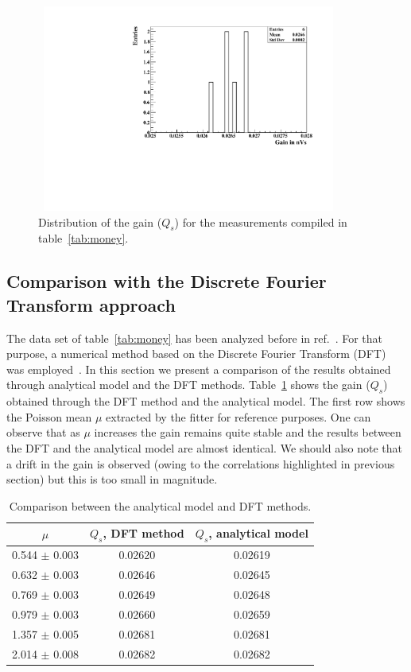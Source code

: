 \documentclass[preprint,12pt]{elsarticle}
\begin{document}
\begin{figure}[!t]
\centering
\includegraphics[width=10.0cm, height=6.8cm]{figures/Qs.pdf} 
\caption{Distribution of the gain ($Q_s$) for the measurements compiled in table~\ref{tab:money}. }
\label{fig:g}
\end{figure}

\subsection{Comparison with the Discrete Fourier Transform approach}

The data set of table~\ref{tab:money} has been analyzed before in ref.~\cite{me2}. 
For that purpose, a numerical method based on the Discrete Fourier Transform (DFT) was employed~\cite{me}. 
In this section we present a comparison of the results obtained through analytical model and the DFT methods. 
 Table~\ref{tab:comp} shows the gain ($Q_s$) obtained through the DFT method and the analytical model. 
The first row shows the Poisson mean $\mu$ extracted by the fitter for reference purposes. 
One can observe that as $\mu$ increases the gain remains quite stable and the results between the DFT and the analytical model are almost identical. 
We should also note that a drift in the gain is observed (owing to the correlations highlighted in previous section) but this is too small in magnitude.   

\begin{table}[t!]
\centering
\begin{tabular}{| c  || c | c |}
\hline
$\mu$                      & $Q_s$, DFT method  	       & $Q_s$, analytical model           \\[0.6ex] \hline\hline
0.544 $\pm$ 0.003  & 0.02620					       & 0.02619 						     				\\
0.632 $\pm$ 0.003  & 0.02646					       & 0.02645					  	    				\\
0.769 $\pm$ 0.003  & 0.02649					       & 0.02648					  	    				\\
0.979 $\pm$ 0.003  & 0.02660					       & 0.02659					    	    				\\
1.357 $\pm$ 0.005  & 0.02681					       & 0.02681					  	    				\\
2.014 $\pm$ 0.008  & 0.02682					       & 0.02682				  			
\\[0.6ex] \hline\hline
\end{tabular}
\caption{Comparison between the analytical model and DFT methods.}
\label{tab:comp}
\end{table}
\end{document}
